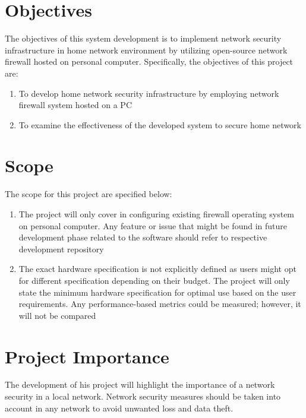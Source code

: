 \documentclass[../index.tex]{subfiles}
\begin{document}
\section{Objectives}

The objectives of this system development is to implement network security infrastructure in home
network environment by utilizing open-source network firewall hosted on personal computer.
Specifically, the objectives of this project are:

\begin{enumerate}

  \item To develop home network security infrastructure by employing network firewall system hosted
    on a PC

  \item To examine the effectiveness of the developed system to secure home network

\end{enumerate}

\section{Scope}

The scope for this project are specified below:

\begin{enumerate}

  \item The project will only cover in configuring existing firewall operating system on personal
    computer. Any feature or issue that might be found in future development phase related to the
    software should refer to respective development repository

  \item The exact hardware specification is not explicitly defined as users might opt for different
    specification depending on their budget. The project will only state the minimum hardware
    specification for optimal use based on the user requirements. Any performance-based metrics
    could be measured; however, it will not be compared

\end{enumerate}

\section{Project Importance}

The development of his project will highlight the importance of a network security in a local
network. Network security measures should be taken into account in any network to avoid unwanted
loss and data theft.
\end{document}
